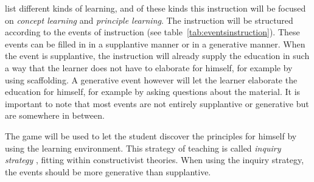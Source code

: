 \documentclass[12pt]{report} %
\begin{document}
 list different kinds of learning, and of these kinds this instruction will be focused on \emph{concept learning} and \emph{principle learning}. The instruction will be structured according to the events of instruction \cite{smithragan} (see table~\ref{tab:eventsinstruction}). These events can be filled in in a supplantive manner or in a generative manner. When the event is supplantive, the instruction will already supply the education in such a way that the learner does not have to elaborate for himself, for example by using scaffolding. A generative event however will let the learner elaborate the education for himself, for example by asking questions about the material. It is important to note that most events are not entirely supplantive or generative but are somewhere in between.

The game will be used to let the student discover the principles for himself by using the learning environment. This strategy of teaching is called \emph{inquiry strategy} \cite{smithragan}, fitting within constructivist theories. When using the inquiry strategy, the events should be more generative than supplantive.
\end{document}
